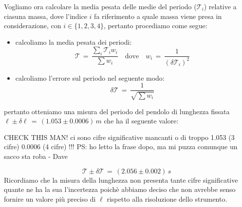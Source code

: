 Vogliamo ora calcolare la media pesata delle medie del periodo ($\mathcal{T}_i$) relative a ciasuna massa, dove l'indice $i$ fa riferimento a quale massa viene presa in considerazione, con $i \in \{1,2,3,4\}$, pertanto procediamo come segue:
\begin{itemize}
	\item{calcoliamo la media pesata dei periodi:
			\begin{equation*}
				\mathcal{T} \,=\, \frac{\sum_i \mathcal{T}_i w_i}{\sum w_i} \quad \text{dove} \quad w_i \,=\, \frac{1}{(\delta \mathcal{T}_i)^2}
			\end{equation*}
			}
	\item{calcoliamo l'errore sul periodo nel seguente modo:
			\begin{equation*}
				\delta \mathcal{T} \,=\, \frac{1}{\sqrt{\sum w_i}}
			\end{equation*}
			}
\end{itemize}
pertanto otteniamo una misura del periodo del pendolo di lunghezza fissata $\ell \pm \delta \ell \,=\, (1.053 \pm 0.0006) \, m$ che ha il seguente valore:

CHECK THIS MAN! ci sono cifre significative mancanti o di troppo 1.053 (3 cifre) 0.0006 (4 cifre) !!! PS: ho letto la frase dopo, ma mi puzza comunque un sacco sta roba - Dave

\begin{equation*}
	\mathcal{T} \pm \delta \mathcal{T} \,=\, (2.056 \pm 0.002) \, s
\end{equation*}
%
Ricordiamo che la misura della lunghezza non presenta tante cifre significative quante ne ha la sua l'incertezza poichè abbiamo deciso che non avrebbe senso fornire un valore più preciso di $\ell$ rispetto alla risoluzione dello strumento.